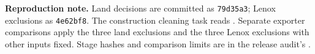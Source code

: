 \noindent\begin{minipage}{\linewidth}
\textbf{Reproduction note.}
Land decisions are committed as \texttt{79d35a3}; Lenox exclusions as
\texttt{4e62bf8}. The construction cleaning task reads
.
Separate exporter comparisons apply the three land exclusions and the three
Lenox exclusions with other inputs fixed. Stage hashes and comparison limits
are in the release audit's .
\end{minipage}
